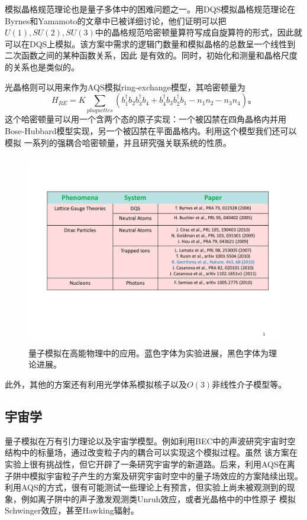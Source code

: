 模拟晶格规范理论也是量子多体中的困难问题之一。用DQS模拟晶格规范理论在Byrnes和Yamamoto的文章中已被详细讨论\cite{energy4}，他们证明可以把$U(1), SU(2), SU(3)$中的晶格规范哈密顿量算符写成自旋算符的形式，因此就可以在DQS上模拟。该方案中需求的逻辑门数量和模拟晶格的总数呈一个线性到二次函数之间的某种函数关系，因此
是有效的。同时，初始化和测量和晶格尺度的关系也是类似的。

光晶格则可以用来作为AQS模拟ring-exchange模型\cite{energy5,energy6}，其哈密顿量为
\begin{equation}\label{supersim}
 H_{RE} = K\sum_{plaquettes}(b_1^{\dagger}b_2b_3^{\dagger}b_4+b_4^{\dagger}b_3b_2^{\dagger}b_1-n_1n_2-n_3n_4)。
\end{equation}
这个哈密顿量可以用一个含两个态的原子实现：一个被囚禁在四角晶格内并用Bose-Hubbard模型实现，另一个被囚禁在平面晶格内。利用这个模型我们还可以模拟
一系列的强耦合哈密顿量，并且研究强关联系统的性质。
\begin{figure}[htbp]
            \begin{center}
              \includegraphics[width= 0.8\columnwidth]{figures/simhigh.pdf}
              \caption{量子模拟在高能物理中的应用。蓝色字体为实验进展，黑色字体为理论进展。
              }
              \label{simhigh}
            \end{center}
\end{figure}

此外，其他的方案还有利用光学体系模拟核子\cite{energy7}以及$O(3)$非线性介子模型\cite{energy8}等。

  \subsection{宇宙学}

量子模拟在万有引力理论以及宇宙学模型。例如利用BEC中的声波研究宇宙时空结构中的标量场\cite{cosmic}，通过改变粒子内的耦合可以实现这个模拟过程。虽然
该方案在实验上很有挑战性，但它开辟了一条研究宇宙学的新道路。后来，利用AQS在离子阱中模拟宇宙粒子产生的方案\cite{cosmo1}及研究宇宙时空中的量子场效应的方案\cite{cosmo2}陆续出现。
利用AQS的方式，很有可能测试一些理论上有预言，但实验上尚未被观测到的现象，例如离子阱中的声子激发观测类Unruh效应\cite{unruh}，或者光晶格中的中性原子
模拟Schwinger效应\cite{cosmo3}，甚至Hawking辐射\cite{cosmo4,cosmo5}。

